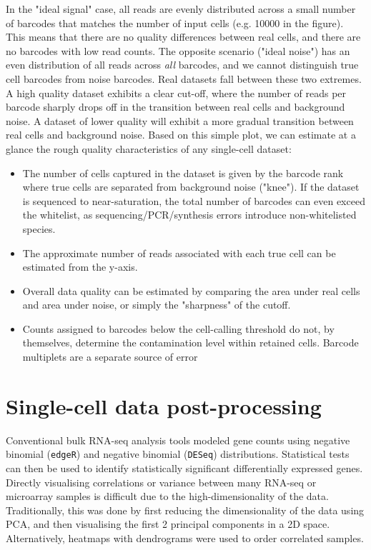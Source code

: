 In the "ideal signal" case, all reads are evenly distributed across a small number of barcodes that matches the number of input cells (e.g. \num{10000} in the figure). This means that there are no quality differences between real cells, and there are no barcodes with low read counts. The opposite scenario ("ideal noise") has an even distribution of all reads across \textit{all} barcodes, and we cannot distinguish true cell barcodes from noise barcodes. Real datasets fall between these two extremes. A high quality dataset exhibits a clear cut-off, where the number of reads per barcode sharply drops off in the transition between real cells and background noise. A dataset of lower quality will exhibit a more gradual transition between real cells and background noise. Based on this simple plot, we can estimate at a glance the rough quality characteristics of any single-cell dataset:

\begin{itemize}[noitemsep]
	\item The number of cells captured in the dataset is given by the barcode rank where true cells are separated from background noise ("knee"). If the dataset is sequenced to near-saturation, the total number of barcodes can even exceed the whitelist, as sequencing/PCR/synthesis errors introduce non-whitelisted species.
	\item The approximate number of reads associated with each true cell can be estimated from the y-axis.
	\item Overall data quality can be estimated by comparing the area under real cells and area under noise, or simply the "sharpness" of the cutoff.
	\item Counts assigned to barcodes below the cell-calling threshold do not, by themselves, determine the contamination level within retained cells. Barcode multiplets are a separate source of error
\end{itemize}

\section{Single-cell data post-processing}

Conventional bulk RNA-seq analysis tools modeled gene counts using negative binomial (\verb|edgeR|) and negative binomial (\verb|DESeq|) distributions. Statistical tests can then be used to identify statistically significant differentially expressed genes. Directly visualising correlations or variance between many RNA-seq or microarray samples is difficult due to the high-dimensionality of the data. Traditionally, this was done by first reducing the dimensionality of the data using PCA, and then visualising the first 2 principal components in a 2D space. Alternatively, heatmaps with dendrograms were used to order correlated samples.

